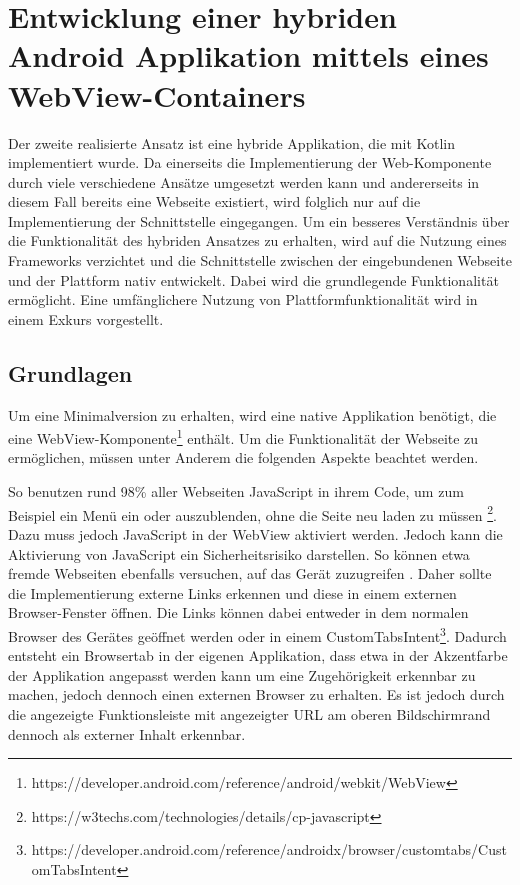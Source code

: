 \section{Entwicklung einer hybriden Android Applikation mittels eines WebView-Containers}
Der zweite realisierte Ansatz ist eine hybride Applikation, die mit Kotlin implementiert wurde. 
Da einerseits die Implementierung der Web-Komponente durch viele verschiedene Ansätze umgesetzt werden kann und andererseits in diesem Fall bereits eine Webseite existiert, wird folglich nur auf die Implementierung der Schnittstelle eingegangen. 
Um ein besseres Verständnis über die Funktionalität des hybriden Ansatzes zu erhalten, wird auf die Nutzung eines Frameworks verzichtet und die Schnittstelle zwischen der eingebundenen Webseite und der Plattform nativ entwickelt.
Dabei wird die grundlegende Funktionalität ermöglicht. Eine umfänglichere Nutzung von Plattformfunktionalität wird in einem Exkurs vorgestellt.

\subsection{Grundlagen}
Um eine Minimalversion zu erhalten, wird eine native Applikation benötigt, die eine WebView-Komponente\footnote{https://developer.android.com/reference/android/webkit/WebView} enthält. Um die Funktionalität der Webseite zu ermöglichen, müssen unter Anderem die folgenden Aspekte beachtet werden.

So benutzen rund 98\% aller Webseiten JavaScript in ihrem Code, um zum Beispiel ein Menü ein oder auszublenden, ohne die Seite neu laden zu müssen \footnote{https://w3techs.com/technologies/details/cp-javascript}. 
Dazu muss jedoch JavaScript in der WebView aktiviert werden. 
Jedoch kann die Aktivierung von JavaScript ein Sicherheitsrisiko darstellen. So können etwa fremde Webseiten ebenfalls versuchen, auf das Gerät zuzugreifen \cite{webview_javascript_security}. 
Daher sollte die Implementierung externe Links erkennen und diese in einem externen Browser-Fenster öffnen.
Die Links können dabei entweder in dem normalen Browser des Gerätes geöffnet werden oder in einem CustomTabsIntent\footnote{https://developer.android.com/reference/androidx/browser/customtabs/CustomTabsIntent}.
Dadurch entsteht ein Browsertab in der eigenen Applikation, dass etwa in der Akzentfarbe der Applikation angepasst werden kann um eine Zugehörigkeit erkennbar zu machen, jedoch dennoch einen externen Browser zu erhalten. Es ist jedoch durch die angezeigte Funktionsleiste mit angezeigter URL am oberen Bildschirmrand dennoch als externer Inhalt erkennbar.

